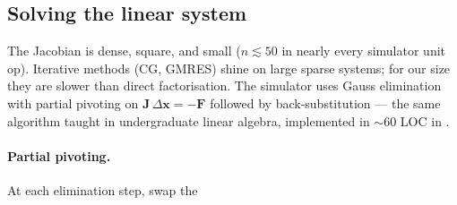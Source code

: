\documentclass[11pt,a4paper]{article}
\newcommand{\xv}{\mathbf{x}}
\newcommand{\Fv}{\mathbf{F}}
\newcommand{\Jac}{\mathbf{J}}
\begin{document}
\subsection{Solving the linear system}

The Jacobian is dense, square, and small ($n \lesssim 50$ in nearly
every simulator unit op).  Iterative methods (CG, GMRES) shine on
large sparse systems; for our size they are slower than direct
factorisation.  The simulator uses Gauss elimination with partial
pivoting on $\Jac\,\Delta\xv = -\Fv$ followed by back-substitution
--- the same algorithm taught in undergraduate linear algebra,
implemented in $\sim 60$ LOC in .

\paragraph{Partial pivoting.}  At each elimination step, swap the
\end{document}
